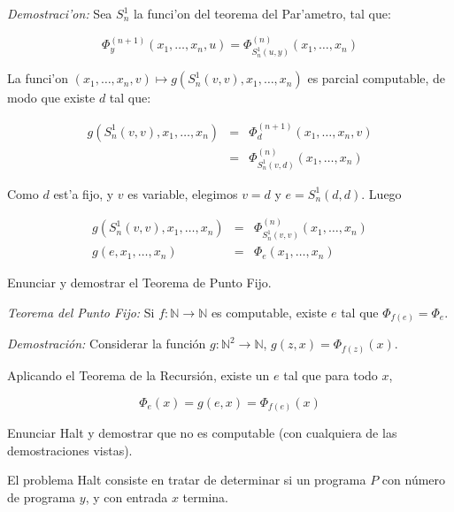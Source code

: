 \begin{questions}
\begin{solution}
  {\it Demostraci'on:} Sea $S_n^1$ la funci'on del teorema del Par'ametro, tal que: 

  \begin{equation*}
  \Phi_y^{(n+1)}(x_1, \dots, x_n, u) = \Phi_{S_n^1(u,y)}^{(n)}(x_1, \dots, x_n)
  \end{equation*}

  La funci'on $(x_1, \dots, x_n, v) \mapsto g(S_n^1(v,v), x_1, \dots, x_n)$ es parcial computable, de modo que existe $d$ tal que: 

  \begin{eqnarray*}
  g(S_n^1(v,v), x_1, \dots, x_n) &=& \Phi_d^{(n+1)}(x_1, \dots, x_n, v) \\
				  &=& \Phi_{S_n^1(v,d)}^{(n)}(x_1, \dots, x_n)
  \end{eqnarray*}

  Como $d$ est'a fijo, y $v$ es variable, elegimos $v = d$ y $e = S_n^1(d,d)$. Luego

  \begin{eqnarray*}
  g(S_n^1(v,v), x_1, \dots, x_n) &=& \Phi_{S_n^1(v,v)}^{(n)}(x_1, \dots, x_n) \\
	    g(e, x_1, \dots, x_n) &=& \Phi_e(x_1, \dots, x_n)
  \end{eqnarray*}
\end{solution}

\question Enunciar y demostrar el Teorema de Punto Fijo.

\begin{solution}

 {\it Teorema del Punto Fijo: } Si $f : \mathbb{N}\rightarrow\mathbb{N}$ es computable, existe $e$ tal que $\Phi_{f(e)}=\Phi_e$.
 
 {\it Demostraci\'on: } Considerar la funci\'on $g : \mathbb{N}^2\rightarrow\mathbb{N}$, $g(z,x) = \Phi_{f(z)}(x)$.
 
 Aplicando el Teorema de la Recursi\'on, existe un $e$ tal que para todo $x$, 
 
 \begin{equation*}
  \Phi_e(x)=g(e,x)=\Phi_{f(e)}(x)
 \end{equation*}

\end{solution}

\question Enunciar Halt y demostrar que no es computable (con cualquiera de las demostraciones vistas).

\begin{solution}

El problema Halt consiste en tratar de determinar si un programa $P$ con n\'umero de programa $y$, y con entrada $x$ termina. 


\end{solution}
\end{questions}
